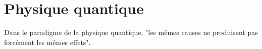 
\section{Physique quantique}
Dans le paradigme de la physique quantique, "les mêmes causes ne produisent pas forcément les mêmes effets". 
